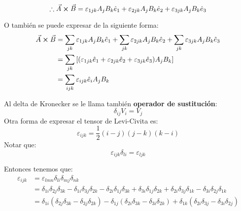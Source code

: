 \documentclass[../main]{subfiles}
\begin{document}
\begin{equation}
    \therefore \vec{A} \cross \vec{B}=\varepsilon_{1jk} A_j B_k \hat{e}_1+\varepsilon_{2jk} A_j B_k \hat{e}_2+\varepsilon_{3jk} A_j B_k \hat{e}_3
\end{equation}
\begin{center}
\end{center}
O también se puede expresar de la siguiente forma:
\begin{align*}
    \vec{A} \cross \vec{B}&=\sum_{jk} \varepsilon_{1jk} A_j B_k \hat{e}_1+\sum_{jk}\varepsilon_{2jk} A_j B_k \hat{e}_2+\sum_{jk}\varepsilon_{3jk} A_j B_k \hat{e}_3 \\
    &=\sum_{jk} \left[(\varepsilon_{1jk}\hat{e}_1+\varepsilon_{2jk}\hat{e}_2+\varepsilon_{3jk}\hat{e}_3)A_j B_k \right]\\
    &=\sum_{ijk} \varepsilon_{ijk} \hat{e}_i A_j B_k
\end{align*}
\begin{center}
\end{center}
\begin{nota}{}
    Al delta de Kronecker se le llama también \textbf{operador de sustitución}:
    \begin{equation*}
        \delta_{ij}V_i=V_j
    \end{equation*}
    Otra forma de expresar el tensor de Levi-Civita es:
    \begin{equation*}
        \varepsilon_{ijk}=\dfrac{1}{2}(i-j)(j-k)(k-i)
    \end{equation*}
    Notar que:
    \begin{equation*}
        \varepsilon_{ijk}\delta_{li}=\varepsilon_{ljk}
    \end{equation*}
\end{nota}
Entonces tenemos que:
\begin{align*}
    \varepsilon_{ijk}&=\varepsilon_{lmn}\delta_{li}\delta_{mj}\delta_{nk} \\
    &=\delta_{1i}\delta_{2j}\delta_{3k}-\delta_{1i}\delta_{3j}\delta_{2k}-\delta_{2i}\delta_{1j}\delta_{3k}+\delta_{3i}\delta_{1j}\delta_{2k}+\delta_{2i}\delta_{3j}\delta_{1k}-\delta_{3i}\delta_{2j}\delta_{1k} \\
    &=\delta_{1i}(\delta_{2j}\delta_{3k}-\delta_{3j}\delta_{2k})-\delta_{1j}(\delta_{2i}\delta_{3k}-\delta_{3i}\delta_{2k})+\delta_{1k}(\delta_{2i}\delta_{3j}-\delta_{3i}\delta_{2j})
\end{align*}
\end{document}
